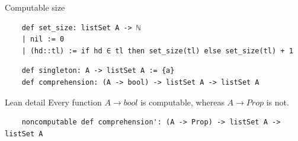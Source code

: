 \documentclass[aspectratio=169]{beamer}
\begin{document}
\begin{frame}[fragile]{Computable size}
    \begin{lstlisting}
    def set_size: listSet A -> ℕ
    | nil := 0
    | (hd::tl) := if hd ∈ tl then set_size(tl) else set_size(tl) + 1
    \end{lstlisting}
    \begin{lstlisting}
    def singleton: A -> listSet A := {a}
    def comprehension: (A -> bool) -> listSet A -> listSet A
    \end{lstlisting}
    \begin{block}{Lean detail}
        Every function $A \to bool$ is computable, whereas $A \to Prop$ is not.
    \end{block}
    
    
    \begin{lstlisting}
    noncomputable def comprehension': (A -> Prop) -> listSet A -> listSet A
    \end{lstlisting}
    \end{frame}
\end{document}
